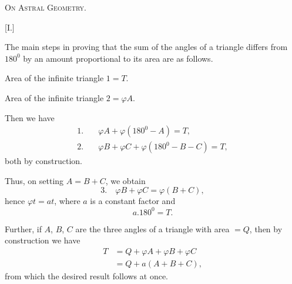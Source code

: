 \clearpage
{}%
\begin{center}\Large\textsc{On Astral Geometry.}\end{center}
\bigskip
\begin{center}[I.]\end{center}
The main steps in proving that the sum of the angles of a triangle differs from $180^{0}$ by an amount proportional to its area are as follows.
\begin{center}\hspace{1em}\end{center}
Area of the infinite triangle $1=T$.

Area of the infinite triangle $2=\varphi A$.

Then we have
\[
\begin{aligned}
1.\quad &\varphi A+\varphi(180^{0}-A)=T,\\
2.\quad &\varphi B+\varphi C+\varphi(180^{0}-B-C)=T,
\end{aligned}
\]
both by construction.

Thus, on setting $A=B+C$, we obtain
\[
3.\quad\varphi B+\varphi C=\varphi(B+C),
\]
hence $\varphi t=at$, where $a$ is a constant factor and
\[
a.180^{0}=T.
\]
\begin{center}\end{center}
Further, if $A$, $B$, $C$ are the three angles of a triangle with area $=Q$, then by construction we have
\[
\begin{aligned}
T&=Q+\varphi A+\varphi B+\varphi C\\
&=Q+a(A+B+C),
\end{aligned}
\]
from which the desired result follows at once.

